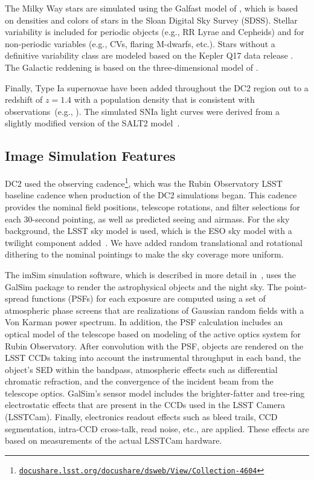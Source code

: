 \documentclass[modern]{descnote}
\newcommand*{\https}[1]{\href{https://#1}{\nolinkurl{#1}}}
\begin{document}
The Milky Way stars are simulated using the Galfast model of \citet{2008ApJ...673..864J}, which is based on densities and colors of stars in the Sloan Digital Sky Survey (SDSS). Stellar variability is included for periodic objects (e.g., RR Lyrae and Cepheids) and for non-periodic variables (e.g., CVs, flaring M-dwarfs, etc.).  Stars without a definitive variability class are modeled based on the Kepler Q17 data release \citep{2016ksci.rept....3T}.  The Galactic reddening is based on the three-dimensional model of \cite{2005AJ....130..659A}.

Finally, Type Ia supernovae have been added throughout the DC2 region out to a redshift of $z=1.4$ with a population density that is consistent with observations~(e.g., \citealt{2010ApJ...713.1026D}). The simulated SNIa light curves were derived from a slightly modified version of the SALT2 model~\citep{2007A&A...466...11G}.

\subsection{Image Simulation Features}

DC2 used the  observing cadence\footnote{ \https{docushare.lsst.org/docushare/dsweb/View/Collection-4604}}, which was the Rubin Observatory LSST baseline cadence when production of the DC2 simulations began. This cadence provides the nominal field positions, telescope rotations, and filter selections for each 30-second pointing, as well as predicted seeing and airmass.  For the sky background, the LSST sky model is used, which is the ESO sky model with a twilight component added~\citep{2016SPIE.9910E..1AY}.  We have added random translational and rotational dithering to the nominal pointings to make the sky coverage more uniform.

The imSim simulation software, which is described in more detail in~\cite{2020arXiv201005926L}, uses the GalSim package \citep{2015A&C....10..121R} to render the astrophysical objects and the night sky.  The point-spread functions (PSFs) for each exposure are computed using a set of atmospheric phase screens that are realizations of Gaussian random fields with a Von Karman power spectrum.  In addition, the PSF calculation includes an optical model of the telescope based on modeling of the active optics system for Rubin Observatory.  After convolution with the PSF, objects are rendered on the LSST CCDs taking into account the instrumental throughput in each band, the object's SED within the bandpass, atmospheric effects such as differential chromatic refraction, and the convergence of the incident beam from the telescope optics. GalSim's sensor model includes the brighter-fatter and tree-ring electrostatic effects that are present in the CCDs used in the LSST Camera (LSSTCam).  Finally, electronics readout effects such as bleed trails, CCD segmentation, intra-CCD cross-talk, read noise, etc., are applied.  These effects are based on measurements of the actual LSSTCam hardware.
\end{document}
